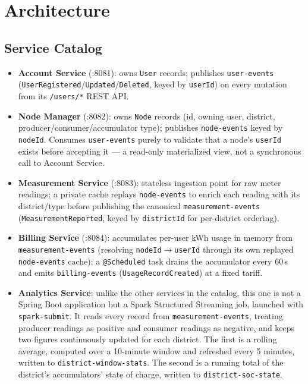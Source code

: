 \section{Architecture}

\subsection*{Service Catalog}
\begin{itemize}
\item \textbf{Account Service} (:8081): owns \texttt{User} records; publishes
  \texttt{user-events} (\texttt{UserRegistered}/\texttt{Updated}/\texttt{Deleted}, keyed by
  \texttt{userId}) on every mutation from its \texttt{/users/*} REST API.
\item \textbf{Node Manager} (:8082): owns \texttt{Node} records (id, owning user, district,
  producer/consumer/accumulator type); publishes \texttt{node-events} keyed by \texttt{nodeId}.
  Consumes \texttt{user-events} purely to validate that a node's \texttt{userId} exists before
  accepting it --- a read-only materialized view, not a synchronous call to Account Service.
\item \textbf{Measurement Service} (:8083): stateless ingestion point for raw meter readings; a
  private cache replays \texttt{node-events} to enrich each reading with its district/type before
  publishing the canonical \texttt{measurement-events} (\texttt{MeasurementReported}, keyed by
  \texttt{districtId} for per-district ordering).
\item \textbf{Billing Service} (:8084): accumulates per-user kWh usage in memory from
  \texttt{measurement-events} (resolving \texttt{nodeId}$\to$\texttt{userId} through its own
  replayed \texttt{node-events} cache); a \texttt{@Scheduled} task drains the accumulator every
  60\,s and emits \texttt{billing-events} (\texttt{UsageRecordCreated}) at a fixed tariff.
\item \textbf{Analytics Service}: unlike the other services in the catalog, this one is not a
  Spring Boot application but a Spark Structured Streaming job, launched with
  \texttt{spark-submit}. It reads every record from \texttt{measurement-events}, treating producer
  readings as positive and consumer readings as negative, and keeps two figures continuously
  updated for each district. The first is a rolling average, computed over a 10-minute window and
  refreshed every 5 minutes, written to \texttt{district-window-stats}. The second is a running
  total of the district's accumulators' state of charge, written to \texttt{district-soc-state}.

\end{itemize}

